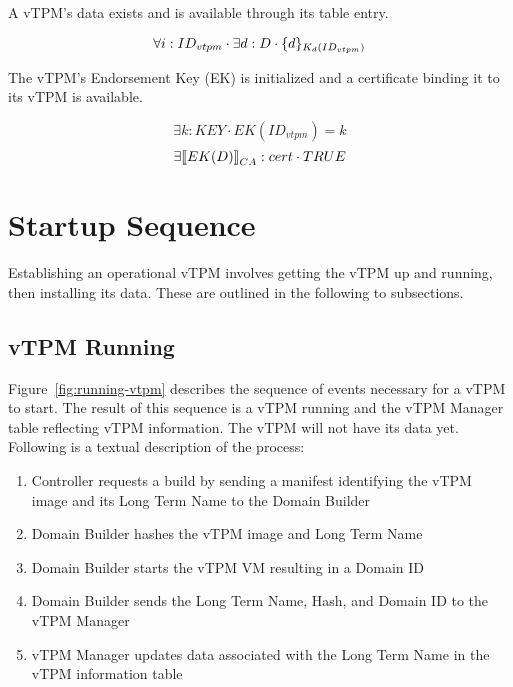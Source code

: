 \documentclass[10pt]{article}
\begin{document}
\begin{invariant}
  A vTPM's data exists and is available through its table entry.

  \[\forall i:ID_{vtpm} \cdot \exists d:D \cdot \{d\}_{K_{d}(ID_{vtpm})}\]
\end{invariant}

\begin{invariant}
  The vTPM's Endorsement Key (EK) is initialized and a certificate
  binding it to its vTPM is available.

  \[\exists k:KEY \cdot EK(ID_{vtpm})=k\] 
  \[\exists |[EK(D)|]_{CA}:cert \cdot TRUE\]
\end{invariant}

\section{Startup Sequence}

Establishing an operational vTPM involves getting the vTPM up and
running, then installing its data.  These are outlined in the
following to subsections.

\subsection{vTPM Running}

Figure~\ref{fig:running-vtpm} describes the sequence of events
necessary for a vTPM to start.  The result of this sequence is a vTPM
running and the vTPM Manager table reflecting vTPM information.  The
vTPM will not have its data yet.  Following is a textual description
of the process:

\begin{enumerate}
  \parskip=0pt\itemsep=0pt
\item Controller requests a build by sending a manifest identifying
  the vTPM image and its Long Term Name to the Domain Builder
\item Domain Builder hashes the vTPM image and Long Term Name
\item Domain Builder starts the vTPM VM resulting in a Domain ID
\item Domain Builder sends the Long Term Name, Hash, and Domain ID to
  the vTPM Manager
\item vTPM Manager updates data associated with the Long Term Name in
  the vTPM information table
\end{enumerate}
\end{document}
